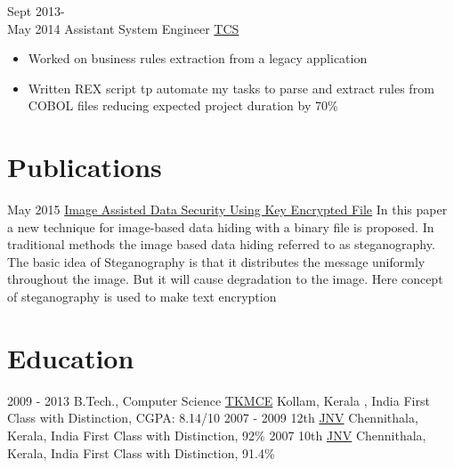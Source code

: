 \documentclass[letterpaper]{twentysecondcv} %
\begin{document}
\begin{twenty}
	\twentyitem
    	{Sept 2013-\\ May 2014}
        {Assistant System Engineer}
        {\href{https://www.tcs.com/}{TCS}}
        {}
        {
        \begin{itemize}
        	\item Worked on business rules extraction from a legacy application
            \item Written REX script tp automate my tasks to parse and extract rules from COBOL files reducing expected project duration by 70\% 
        \end{itemize}
        }
\end{twenty}


\section{Publications}
\begin{twenty}
	\twentyitem
    	{May 2015}
        {}
        {\href{http://www.ijert.org/view-pdf/13070/image-assisted-data-security-using-key-encrypted-file}{Image Assisted Data Security Using Key Encrypted File}}
        {}
        {
        {In this paper a new technique for image-based data hiding with a binary file is proposed. In traditional methods the image based data hiding referred to as steganography. The basic idea of Steganography is that it distributes the message uniformly throughout the image. But it will cause degradation to the image. Here concept of steganography is used to make text encryption
        }
        }
\end{twenty}

\section{Education}
\begin{twenty} %
	\twentyitem
    	{2009 - 2013}
        {B.Tech., Computer Science}
        {\href{http://tkmce.ac.in/}{TKMCE}}
        {Kollam, Kerala , India}
        {First Class with Distinction, CGPA: 8.14/10}
	\twentyitem
    	{2007 - 2009}
        {12th}
        {\href{http://www.nvshq.org/}{JNV}}
        {Chennithala, Kerala, India}
        {First Class with Distinction, 92\%}
    \twentyitem
    	{2007}
        {10th}
        {\href{http://www.nvshq.org/}{JNV}}
        {Chennithala, Kerala, India}
        {First Class with Distinction, 91.4\%}
\end{twenty}
\end{document}
